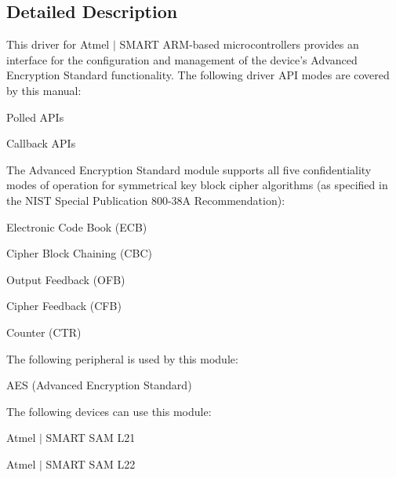 \subsection{Detailed Description}
This driver for Atmel\textregistered{} $\vert$ S\+M\+A\+R\+T A\+R\+M\textregistered{}-\/based microcontrollers provides an interface for the configuration and management of the device's Advanced Encryption Standard functionality. The following driver A\+P\+I modes are covered by this manual\+:


\begin{DoxyItemize}
\item Polled A\+P\+Is
\item Callback A\+P\+Is
\end{DoxyItemize}

The Advanced Encryption Standard module supports all five confidentiality modes of operation for symmetrical key block cipher algorithms (as specified in the N\+I\+S\+T Special Publication 800-\/38\+A Recommendation)\+:
\begin{DoxyItemize}
\item Electronic Code Book (E\+C\+B)
\item Cipher Block Chaining (C\+B\+C)
\item Output Feedback (O\+F\+B)
\item Cipher Feedback (C\+F\+B)
\item Counter (C\+T\+R)
\end{DoxyItemize}

The following peripheral is used by this module\+:
\begin{DoxyItemize}
\item A\+E\+S (Advanced Encryption Standard)
\end{DoxyItemize}

The following devices can use this module\+:
\begin{DoxyItemize}
\item Atmel $\vert$ S\+M\+A\+R\+T S\+A\+M L21
\item Atmel $\vert$ S\+M\+A\+R\+T S\+A\+M L22
\end{DoxyItemize}

